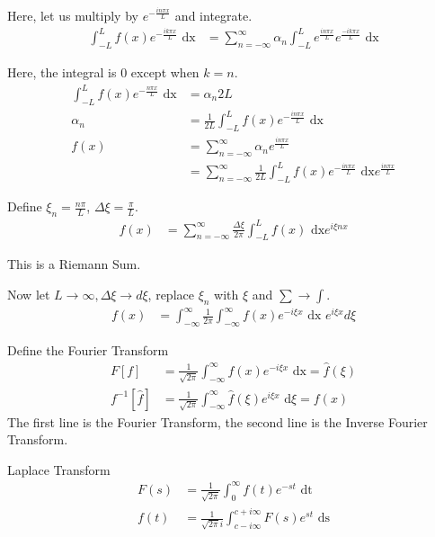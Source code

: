Here, let us multiply by $e^{-\frac{i n \pi x}{L}}$ and integrate.
%
\begin{align}
  \int^L_{-L} f(x)e^{-\frac{i k \pi x}{L}} \text{ dx} & =
  \sum^\infty_{n = -\infty} \alpha_n \int^L_{-L} e^{\frac{i n \pi x}{L}} e^{\frac{-i k \pi x}{L}} \text{ dx}
\end{align}

Here, the integral is $0$ except when $k = n$.
%
\begin{align}
  \int^L_{-L} f(x) e^{- \frac{n \pi x}{L}} \text{ dx} & = \alpha_n 2L\\
  \alpha_n & = \frac{1}{2L} \int^L_{-L} f(x)e^{-\frac{i n \pi x}{L}} \text{ dx}\\
  f(x) & = \sum^\infty_{n = -\infty} \alpha_n e^{\frac{i n \pi x}{L}}\\
  & = \sum^\infty_{n = -\infty} \frac{1}{2L} \int^L_{-L} f(x) e^{- \frac{i n \pi x}{L}} \text{ dx} e^{\frac{i n \pi x}{L}}
\end{align}


Define $\xi_n = \frac{n \pi}{L}$, $\Delta \xi = \frac{\pi}{L}$.
%
\begin{align}
  f(x) & = \sum^\infty_{n = -\infty} \frac{\Delta \xi}{2 \pi} \int^L_{-L} f(x) \text{ dx} e^{i \xi n x}
\end{align}

This is a Riemann Sum.

Now let $L \to \infty, \Delta \xi \to d \xi$, replace $\xi_n$ with $\xi$ and $\sum \rightarrow \int$.
%
\begin{align}
  f(x) & = \int^\infty_{-\infty} \frac{1}{2 \pi} \int^\infty_{-\infty} f(x) e^{-i \xi x} \text{ dx } e^{i \xi x} d\xi
\end{align}

Define the Fourier Transform
%
\begin{align}
  F[f] & = \frac{1}{\sqrt {2 \pi}} \int^\infty_{- \infty} f(x) e^{-i \xi x} \text{ dx} = \hat f(\xi)\\
  f^{-1}[\hat f] & = \frac{1}{\sqrt{2 \pi}} \int^\infty_{- \infty} \hat f(\xi) e^{i \xi x} \text{ d}\xi = f(x)
\end{align}
The first line is the Fourier Transform, the second line is the Inverse Fourier Transform.

\note Laplace Transform
%
\begin{align}
  F(s) & = \frac{1}{\sqrt{2 \pi}} \int^\infty_0 f(t) e^{-st} \text{ dt}\\
  f(t) & = \frac{1}{\sqrt{2 \pi} i} \int^{c + i \infty}_{c - i\infty} F(s)e^{st} \text{ ds}
\end{align}

